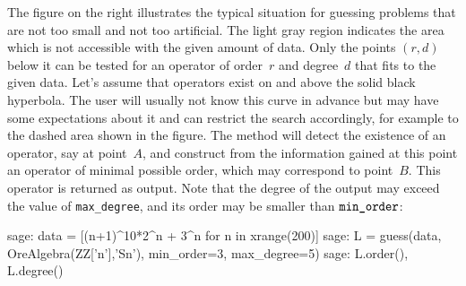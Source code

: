 \documentclass{amsart}
\begin{document}
\hangindent=-6.3cm\leavevmode
{}%
The figure on the right illustrates the typical situation for guessing problems
that are not too small and not too artificial. The light gray region indicates
the area which is not accessible with the given amount of data. Only the points
$(r,d)$ below it can be tested for an operator of order~$r$ and degree~$d$ that
fits to the given data. Let's assume that operators exist on and above the solid
black hyperbola. The user will usually not know this curve in advance but may
have some expectations about it and can restrict the search accordingly, for
example to the dashed area shown in the figure. The method will detect the
existence of an operator, say at point~$A$, and construct from the information
gained at this point an operator of minimal possible order, which may correspond
to point~$B$.  This operator is returned as output. Note that the degree of the
output may exceed the value of \verb|max_degree|, and its order may be smaller
than $\verb|min_order|$:

\begin{sageexample}
sage: data = [(n+1)^10*2^n + 3^n for n in xrange(200)]
sage: L = guess(data, OreAlgebra(ZZ['n'],'Sn'), min_order=3, max_degree=5)
sage: L.order(), L.degree()
\end{sageexample}
\end{document}
